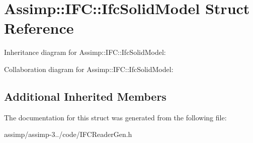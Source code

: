 \hypertarget{struct_assimp_1_1_i_f_c_1_1_ifc_solid_model}{\section{Assimp\+:\+:I\+F\+C\+:\+:Ifc\+Solid\+Model Struct Reference}
\label{struct_assimp_1_1_i_f_c_1_1_ifc_solid_model}
}


Inheritance diagram for Assimp\+:\+:I\+F\+C\+:\+:Ifc\+Solid\+Model\+:


Collaboration diagram for Assimp\+:\+:I\+F\+C\+:\+:Ifc\+Solid\+Model\+:
\subsection*{Additional Inherited Members}


The documentation for this struct was generated from the following file\+:\begin{DoxyCompactItemize}
\item 
assimp/assimp-\/3../code/I\+F\+C\+Reader\+Gen.\+h\end{DoxyCompactItemize}
